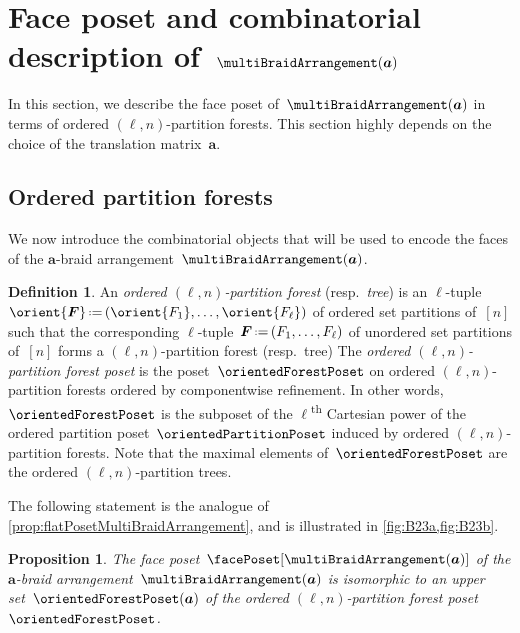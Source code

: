\documentclass{amsart}
\newcommand{\darkblue}{\color{darkblue}} %
\newtheorem{proposition}[theorem]{Proposition}
\theoremstyle{definition}
\newtheorem{definition}[theorem]{Definition}
\renewcommand{\b}[1]{{\boldsymbol{#1}}} %
\newcommand{\eqdef}{\mbox{\,\raisebox{0.2ex}{\scriptsize\ensuremath{\mathrm:}}\ensuremath{=}\,}} %
\newcommand{\resp}{resp.~} %
\newcommand{\ordinal}{\textsuperscript{th}} %
\newcommand{\defn}[1]{\textsl{\darkblue #1}} %
\renewcommand{\b}[1]{\boldsymbol{#1}} %
\begin{document}

\section{Face poset and combinatorial description of~$\multiBraidArrangement(\b{a})$}
\label{sec:facePoset}

In this section, we describe the face poset of~$\multiBraidArrangement(\b{a})$ in terms of ordered $(\ell,n)$-partition forests.
This section highly depends on the choice of the translation matrix~$\b{a}$.


\subsection{Ordered partition forests}
\label{subsec:orderedPartitionForests}

We now introduce the combinatorial objects that will be used to encode the faces of the $\b{a}$-braid arrangement~$\multiBraidArrangement(\b{a})$.

\begin{definition}
\label{def:orderedPartitionForest}
An \defn{ordered $(\ell,n)$-partition forest} (\resp \defn{tree}) is an $\ell$-tuple~$\orient{\b{F}} \eqdef (\orient{F_1}, \dots, \orient{F_\ell})$ of ordered set partitions of~$[n]$ such that the corresponding $\ell$-tuple~$\b{F} \eqdef (F_1, \dots, F_\ell)$ of unordered set partitions of~$[n]$ forms a $(\ell,n)$-partition forest (\resp tree)
The \defn{ordered $(\ell,n)$-partition forest poset} is the poset~$\orientedForestPoset$ on ordered $(\ell,n)$-partition forests ordered by componentwise refinement.
In other words, $\orientedForestPoset$ is the subposet of the $\ell$\ordinal{} Cartesian power of the ordered partition poset~$\orientedPartitionPoset$ induced by ordered $(\ell,n)$-partition forests.
Note that the maximal elements of~$\orientedForestPoset$ are the ordered $(\ell, n)$-partition trees.
\end{definition}

The following statement is the analogue of \cref{prop:flatPosetMultiBraidArrangement}, and is illustrated in \cref{fig:B23a,fig:B23b}.

\begin{proposition}
\label{prop:facePosetMultiBraidArrangement}
The face poset~$\facePoset[\multiBraidArrangement(\b{a})]$ of the $\b{a}$-braid arrangement~$\multiBraidArrangement(\b{a})$ is isomorphic to an upper set~$\orientedForestPoset(\b{a})$ of the ordered $(\ell,n)$-partition forest poset~$\orientedForestPoset$.
\end{proposition}
\end{document}
